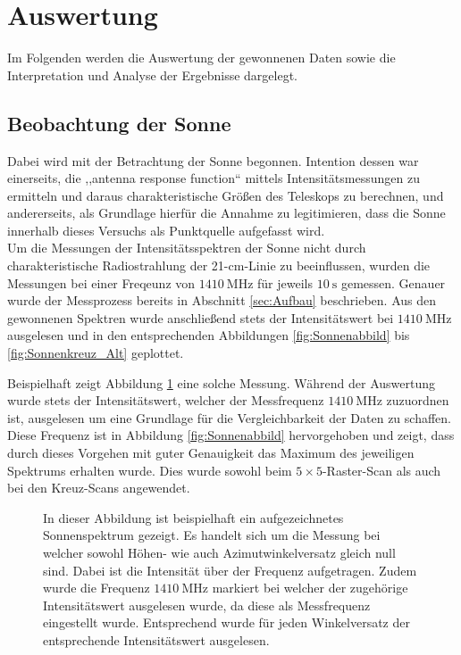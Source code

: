 \section{Auswertung}
Im Folgenden werden die Auswertung der gewonnenen Daten sowie die Interpretation und Analyse der Ergebnisse dargelegt.
    \subsection{Beobachtung der Sonne}
    Dabei wird mit der Betrachtung der Sonne begonnen.
    Intention dessen war einerseits, die ,,antenna response function`` mittels Intensitätsmessungen zu ermitteln und
    daraus charakteristische Größen des Teleskops zu berechnen, und andererseits, als Grundlage hierfür die Annahme zu legitimieren,
    dass die Sonne innerhalb dieses Versuchs als Punktquelle aufgefasst wird.\\

    Um die Messungen der Intensitätsspektren der Sonne nicht durch charakteristische Radiostrahlung der
    21-\si{\centi \metre}-Linie zu beeinflussen,
    wurden die Messungen bei einer Freqeunz von $\SI{1410}{\mega \hertz}$ für jeweils $\SI{10}{\second}$ gemessen.
    Genauer wurde der Messprozess bereits in Abschnitt \ref{sec:Aufbau} beschrieben. 
    Aus den gewonnenen Spektren wurde anschließend stets der Intensitätswert bei $\SI{1410}{\mega \hertz}$ ausgelesen und in den entsprechenden Abbildungen \ref{fig:Sonnenabbild} bis \ref{fig:Sonnenkreuz_Alt} geplottet. 

    Beispielhaft zeigt Abbildung \ref{fig:Sonnenspektrum} eine solche Messung. Während der Auswertung wurde stets der Intensitätswert, welcher der Messfrequenz $\SI{1410}{\mega \hertz}$ zuzuordnen ist, ausgelesen um eine Grundlage für die Vergleichbarkeit der Daten zu schaffen. Diese Frequenz ist in Abbildung \ref{fig:Sonnenabbild} hervorgehoben und zeigt, dass durch dieses Vorgehen mit guter Genauigkeit das Maximum des jeweiligen Spektrums erhalten wurde. Dies wurde sowohl beim $5 \times 5$-Raster-Scan als auch bei den Kreuz-Scans angewendet.

    \begin{figure}[ht]
        \centering
        
        \caption[Beispielspektrum der Sonnenmessungen]{In dieser Abbildung ist beispielhaft ein aufgezeichnetes Sonnenspektrum gezeigt. Es handelt sich um die Messung bei welcher sowohl Höhen- wie auch Azimutwinkelversatz gleich null sind. Dabei ist die Intensität über der Frequenz aufgetragen. Zudem wurde die Frequenz $\SI{1410}{\mega \hertz}$ markiert bei welcher der zugehörige Intensitätswert ausgelesen wurde, da diese als Messfrequenz eingestellt wurde. Entsprechend wurde für jeden Winkelversatz der entsprechende Intensitätswert ausgelesen.}
        \label{fig:Sonnenspektrum}
    \end{figure}

